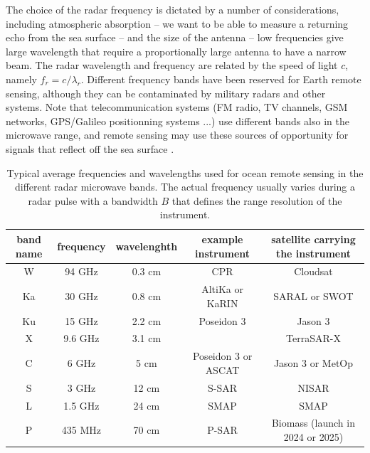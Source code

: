 The choice of the radar frequency is dictated by 
a number of considerations, including atmospheric absorption -- we want to be able to measure a returning echo from the sea surface -- and the 
size of the antenna -- low frequencies give large wavelength that require a proportionally large antenna to have a narrow beam. The radar wavelength 
and frequency are related by the speed of light $c$, namely $f_r = c / \lambda_r$. Different frequency bands have been reserved for Earth remote sensing, although they can be contaminated by military radars and other 
systems. Note that telecommunication systems (FM radio, TV channels, GSM networks, GPS/Galileo positionning systems ...) use different bands  also in the microwave range, and remote sensing may use these 
sources of opportunity for signals that reflect off the sea surface  \citep[e.g.][]{Lowe&al.2002}.


\begin{table}[hb]
  \centering
  \begin{tabular}{|c|c|c|c| c |}
 \hline
band name & frequency & wavelenghth & example instrument & satellite  carrying the instrument  \\
 \hline
W  & 94 GHz  & 0.3 cm & CPR & Cloudsat  \\
Ka & 30 GHz  & 0.8 cm & AltiKa or KaRIN & SARAL or SWOT  \\
Ku & 15 GHz  & 2.2 cm & Poseidon 3 & Jason 3  \\
X &  9.6 GHz & 3.1 cm & & TerraSAR-X  \\
C & 6 GHz   & 5 cm & Poseidon 3 or ASCAT & Jason 3 or MetOp \\
S & 3 GHz   & 12 cm & S-SAR &  NISAR \\
L & 1.5 GHz  & 24 cm & SMAP  & SMAP \\
P & 435 MHz  & 70 cm & P-SAR & Biomass (launch  in 2024 or 2025) \\
\hline
\end{tabular}
\caption{Typical average frequencies and wavelengths used for ocean remote sensing in the different radar microwave bands. The actual frequency usually varies during a radar pulse with a bandwidth $B$ that defines 
the range resolution of the instrument. \label{table_radars}}
\label{table_bands}
\end{table}

